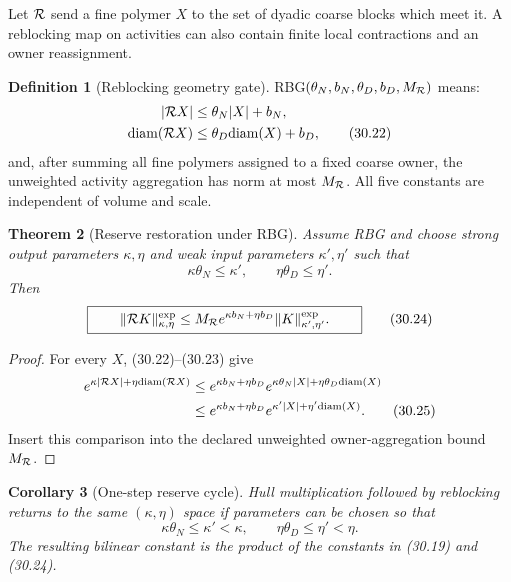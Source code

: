 \documentclass[11pt,oneside]{book}
\newtheorem{theorem}{Theorem}[chapter]
\newtheorem{corollary}[theorem]{Corollary}
\theoremstyle{definition}
\newtheorem{definition}[theorem]{Definition}
\theoremstyle{remark}
\begin{document}
Let \({\cal R}\) send a fine polymer \(X\) to the set of dyadic coarse
blocks which meet it.  A reblocking map on activities can also contain
finite local contractions and an owner reassignment.

\begin{definition}[Reblocking geometry gate]
\label{def:e8v30-RBG}
RBG\((\theta_N,b_N,\theta_D,b_D,M_{\cal R})\) means:
\[
\begin{split}
 |{\cal R}X|&\leq\theta_N|X|+b_N,\\
 {\rm diam}({\cal R}X)&\leq
          \theta_D{\rm diam}(X)+b_D,                             \tag{30.22}
\end{split}
\]
and, after summing all fine polymers assigned to a fixed coarse owner,
the unweighted activity aggregation has norm at most
\(M_{\cal R}\).  All five constants are independent of volume and
scale.
\end{definition}

\begin{theorem}[Reserve restoration under RBG]
\label{thm:e8v30-restoration}
Assume RBG and choose strong output parameters \(\kappa,\eta\) and
weak input parameters \(\kappa',\eta'\) such that
\[
                \kappa\theta_N\leq\kappa',\qquad
                \eta\theta_D\leq\eta'.                           \tag{30.23}
\]
Then
\[
\boxed{\qquad
 \|{\cal R}K\|_{\kappa,\eta}^{\exp}
 \leq
 M_{\cal R}e^{\kappa b_N+\eta b_D}
 \|K\|_{\kappa',\eta'}^{\exp}.
\qquad}                                                           \tag{30.24}
\]
\end{theorem}

\begin{proof}
For every \(X\), (30.22)--(30.23) give
\[
\begin{split}
 e^{\kappa|{\cal R}X|+\eta{\rm diam}({\cal R}X)}
 &\leq
 e^{\kappa b_N+\eta b_D}
 e^{\kappa\theta_N|X|+\eta\theta_D{\rm diam}(X)}\\
 &\leq
 e^{\kappa b_N+\eta b_D}
 e^{\kappa'|X|+\eta'{\rm diam}(X)}.                              \tag{30.25}
\end{split}
\]
Insert this comparison into the declared unweighted owner-aggregation
bound \(M_{\cal R}\).
\end{proof}

\begin{corollary}[One-step reserve cycle]
\label{cor:e8v30-reserve-cycle}
Hull multiplication followed by reblocking returns to the same
\((\kappa,\eta)\) space if parameters can be chosen so that
\[
\boxed{\qquad
 \kappa\theta_N\leq\kappa'<\kappa,\qquad
 \eta\theta_D\leq\eta'<\eta.
\qquad}                                                           \tag{30.26}
\]
The resulting bilinear constant is the product of the constants in
(30.19) and (30.24).
\end{corollary}
\end{document}
